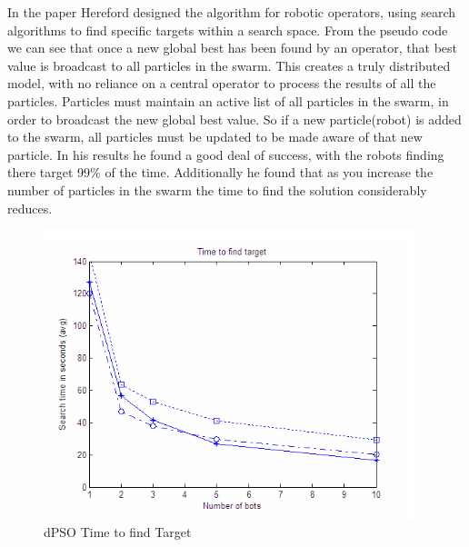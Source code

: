 \documentclass[oneside,12pt]{book}
\begin{document}
In the paper Hereford designed the algorithm for robotic operators, using search algorithms to find specific targets within a search space. From the pseudo code we can see that once a new global best has been found by an operator, that best value is broadcast to all particles in the swarm. 
This creates a truly distributed model, with no reliance on a central operator to process the results of all the particles. Particles must maintain an active list of all particles in the swarm, in order to broadcast the new global best value. So if a new particle(robot) is added to the swarm, all particles must be updated to be made aware of that new particle. 
In his results he found a good deal of success, with the robots finding there target 99\% of the time. Additionally he found that as you increase the number of particles in the swarm the time to find the solution considerably reduces. 
\begin{figure}[H]
    \centering
    \includegraphics[scale=0.9]{Images/HerefordResults.png}
    \caption{dPSO Time to find Target \cite{hereford_2006} }
    \label{fig:dPSO Time to find Target}
\end{figure}
\end{document}
